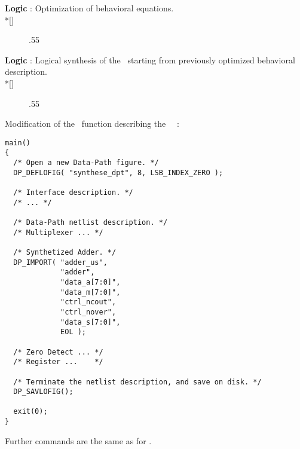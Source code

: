     \begin{minipage}[t]{\textwidth}
       {\bf Logic} : Optimization of behavioral equations.
       \\*[\bigskipamount]
       \forceindent
       \begin{figure}[H]
         \begin{center}
           \leavevmode\epsfxsize.55\textwidth{}
         \end{center}
       \end{figure}
     \end{minipage}
     \begin{minipage}[t]{\textwidth}
       {\bf Logic} : Logical synthesis of the \netlist\ starting from
         previously optimized behavioral description.
       \\*[\bigskipamount]
       \forceindent
       \begin{figure}[H]
         \begin{center}
           \leavevmode\epsfxsize.55\textwidth{}
         \end{center}
       \end{figure}
     \bigskip
     \end{minipage}
     \pagebreak[3]
     \begin{description}
       \samepage
       \item
         Modification of the \C\ function describing the \datapath\ \netlist~:
         { \tt \begin{verbatim}
main()
{
  /* Open a new Data-Path figure. */
  DP_DEFLOFIG( "synthese_dpt", 8, LSB_INDEX_ZERO );

  /* Interface description. */
  /* ... */

  /* Data-Path netlist description. */ 
  /* Multiplexer ... */

  /* Synthetized Adder. */
  DP_IMPORT( "adder_us",
             "adder",
             "data_a[7:0]",
             "data_m[7:0]",
             "ctrl_ncout",
             "ctrl_nover",
             "data_s[7:0]",
             EOL );

  /* Zero Detect ... */
  /* Register ...    */

  /* Terminate the netlist description, and save on disk. */
  DP_SAVLOFIG();

  exit(0);
}
       \end{verbatim} \rm }
       Further commands are the same as for \sampledpt.
     \end{description}
